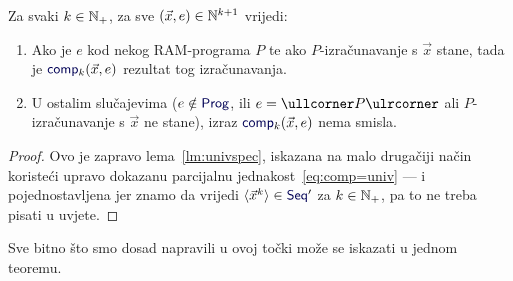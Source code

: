 \begin{korolar}[{name=[specifikacija univerzalnih funkcija]}]\label{kor:compspec}
Za svaki $k\in{\mathbb N}_+$, za sve $(\vec x,e)\in{\mathbb N}^{k+1}$ vrijedi:
\begin{enumerate}
    \item\label{tv:comp} Ako je $e$ kod nekog RAM-programa $P$ te ako $P$-izračunavanje s $\vec x$ stane, tada je $\f{comp}_k(\vec x,e)$ rezultat tog izračunavanja.
    \item\label{tv:ncomp} U ostalim slučajevima ($e\notin\f{Prog}$, ili $e=\kprog{P}$ ali $P$-izračunavanje s $\vec x$ ne stane), izraz $\f{comp}_k(\vec x,e)$ nema smisla.
\end{enumerate}
\end{korolar}
\begin{proof}
Ovo je zapravo lema~\ref{lm:univspec}, iskazana na malo drugačiji način koristeći upravo dokazanu parcijalnu jednakost~\eqref{eq:comp=univ} --- i pojednostavljena jer znamo da vrijedi $\langle\vec x^k\rangle\in\f{Seq}'$ za $k\in{\mathbb N}_+$, pa to ne treba pisati u uvjete.
\end{proof}


Sve bitno što smo dosad napravili u ovoj točki može se iskazati u jednom teoremu.

